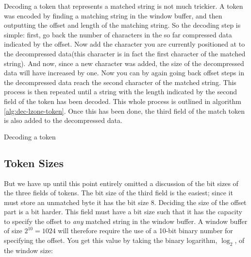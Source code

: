 Decoding a token that represents a matched string is not much
trickier. A token was encoded by finding a matching string in the
window buffer, and then outputting the offset and length of the
matching string. So the decoding step is simple: first, go back the
number of characters in the so far compressed data indicated by the
offset. Now add the character you are currently positioned at to the
decompressed data(this character is in fact the first character of the
matched string). And now, since a new character was added, the size of
the decompressed data will have increased by one. Now you can by again
going back offset steps in the decompressed data reach the second
character of the matched string. This process is then repeated until a
string with the length indicated by the second field of the token has
been decoded. This whole process is outlined in algorithm
\ref{alg:dec-lzone-token}. Once this has been done, the third field of
the match token is also added to the decompressed data.

\begin{algorithm}[H]
  \caption{Decoding a \lzone token}\algohack{}
  \label{alg:dec-lzone-token}
  \begin{algorithmic}[1]

    \EndRepeatn
  \end{algorithmic}
\end{algorithm}

\subsection{Token Sizes}

But we have up until this point entirely omitted a discussion of the
bit sizes of the three fields of \lzone tokens. The bit size of the
third field is the easiest; since it must store an unmatched byte it
has the bit size 8. Deciding the size of the offset part is a bit
harder. This field must have a bit size such that it has the capacity
to specify the offset to \textit{any} matched string in the window
buffer. A window buffer of size $2^{10} = 1024$ will therefore require
the use of a 10-bit binary number for specifying the offset. You get
this value by taking the binary logarithm, $\log_2$, of the window
size:

